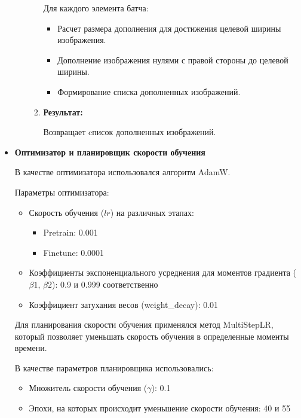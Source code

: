 \begin{itemize}
\begin{itemize}
\begin{enumerate}
                    Для каждого элемента батча:
                    \begin{itemize}
                        \item Расчет  размера  дополнения  для  достижения  целевой  ширины изображения.
                        \item Дополнение  изображения  нулями с  правой  стороны  до  целевой  ширины.
                        \item Формирование  списка  дополненных  изображений.
                    \end{itemize}
            
                \item \textbf{Результат:}

                    Возвращает cписок дополненных изображений.
            \end{enumerate}
    
    \end{itemize}

    \item \textbf{Оптимизатор и планировщик скорости обучения}

    В  качестве  оптимизатора  использовался  алгоритм  AdamW.  

    Параметры  оптимизатора:  
    \begin{itemize}
        \item Скорость  обучения  (\(lr\)) на различных этапах:
        \begin{itemize}
            \item Pretrain:    0.001
            \item Finetune:    0.0001 
        \end{itemize}
        \item Коэффициенты  экспоненциального  усреднения  для  моментов  градиента  (\(\beta1\),  \(\beta2\)):  0.9  и  0.999  соответственно 
        \item Коэффициент  затухания  весов  (weight\_decay):  0.01
    \end{itemize}
    Для  планирования  скорости  обучения  применялся  метод  MultiStepLR,  который  позволяет  уменьшать  скорость  обучения  в  определенные  моменты  времени.  

    В  качестве  параметров  планировщика  использовались: 
    \begin{itemize}
        \item Множитель  скорости  обучения  (\(\gamma\)):  0.1
        \item Эпохи,  на  которых  происходит  уменьшение  скорости  обучения:  40  и  55
    \end{itemize}


\end{itemize}
